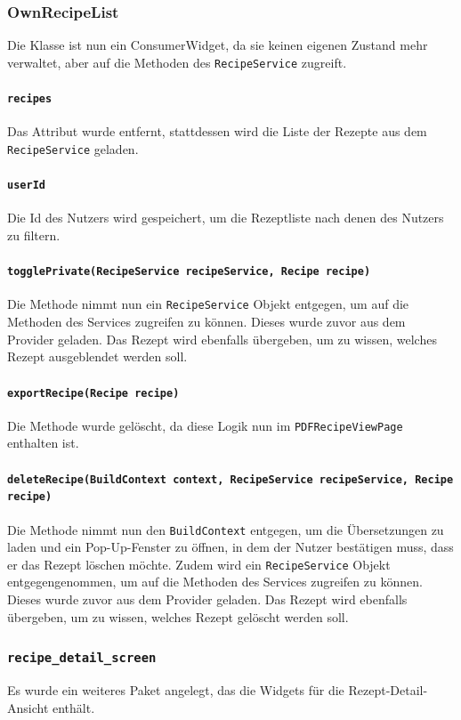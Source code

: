 \documentclass{implementierungsheft}
\begin{document}
\subsubsection*{OwnRecipeList}
Die Klasse ist nun ein ConsumerWidget, da sie keinen eigenen Zustand mehr verwaltet, aber auf die Methoden des \texttt{RecipeService} zugreift.
\paragraph{\texttt{recipes}}
Das Attribut wurde entfernt, stattdessen wird die Liste der Rezepte aus dem \texttt{RecipeSer\-vice} geladen.
\paragraph{\texttt{userId}}
Die Id des Nutzers wird gespeichert, um die Rezeptliste nach denen des Nutzers zu filtern.
\paragraph{\texttt{togglePrivate(RecipeService recipeService, Recipe recipe)}}
Die Methode nimmt nun ein \texttt{RecipeService} Objekt entgegen, um auf die Methoden des Services zugreifen zu können. Dieses wurde zuvor aus dem Provider geladen. Das Rezept wird ebenfalls übergeben, um zu wissen, welches Rezept ausgeblendet werden soll.
\paragraph{\texttt{exportRecipe(Recipe recipe)}}
Die Methode wurde gelöscht, da diese Logik nun im \texttt{PDFRecipe\-ViewPage} enthalten ist.
\paragraph{\texttt{deleteRecipe(BuildContext context, RecipeService recipeService, Recipe recipe)}\\}
Die Methode nimmt nun den \texttt{BuildContext} entgegen, um die Übersetzungen zu laden und ein Pop-Up-Fenster zu öffnen, in dem der Nutzer bestätigen muss, dass er das Rezept löschen möchte. Zudem wird ein \texttt{RecipeService} Objekt entgegengenommen, um auf die Methoden des Services zugreifen zu können. Dieses wurde zuvor aus dem Provider geladen. Das Rezept wird ebenfalls übergeben, um zu wissen, welches Rezept gelöscht werden soll.
\subsubsection{\texttt{recipe\_detail\_screen}}
Es wurde ein weiteres Paket angelegt, das die Widgets für die Rezept-Detail-Ansicht enthält.
\end{document}

